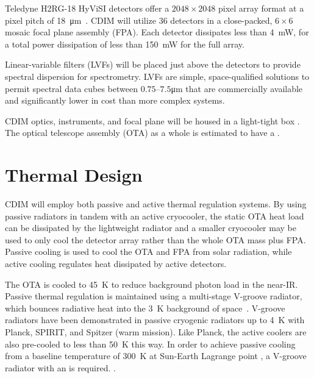 \documentclass{ws-jai}
\begin{document}
Teledyne H2RG-18 HyViSI detectors offer a $2048\times2048$ pixel array format at a pixel pitch of \SI{18}{\micro\meter}~\cite{teledyneH2RG}.
CDIM will utilize 36 detectors in a close-packed, $6\times6$ mosaic focal plane assembly (FPA).
Each detector  dissipates less than \SI{4}{\milli\watt}, for a total power dissipation of less than \SI{150}{\milli\watt} for the full array.

Linear-variable filters (LVFs) will be placed just above the detectors to provide spectral dispersion for spectrometry.
LVFs are simple, space-qualified solutions to permit spectral data cubes between $0.75$--$7.5$\si{\micro\meter} that are commercially available and significantly lower in cost than more complex systems. 

CDIM optics, instruments, and focal plane will be housed in a light-tight box .
The optical telescope assembly (OTA) as a whole is estimated to have a .

\section{Thermal Design}
\label{sec:thermal}
CDIM will employ both passive and active thermal regulation systems.
By using passive radiators in tandem with an active cryocooler, the static OTA heat load can be dissipated by the lightweight radiator and a smaller cryocooler may be used to only cool the detector array rather than the whole OTA mass plus FPA.\@
{}
Passive cooling is used to cool the OTA and FPA from solar radiation, while active cooling regulates heat dissipated by active detectors.

The OTA is cooled to \SI{45}{\kelvin} to reduce background photon load in the near-IR.\@
Passive thermal regulation is maintained using a multi-stage V-groove radiator, which bounces radiative heat into the \SI{3}{\kelvin} background of space~\cite{bard_1987}.
V-groove radiators have been demonstrated in passive cryogenic radiators up to \SI{4}{\kelvin} with Planck, SPIRIT, and Spitzer (warm mission).\@
Like Planck, the active coolers are also pre-cooled to less than \SI{50}{\kelvin} this way. 
In order to achieve passive cooling from a baseline temperature of \SI{300}{\kelvin} at Sun-Earth Lagrange point \Ltwo, a  V-groove radiator with an  is required.
.
\end{document}
